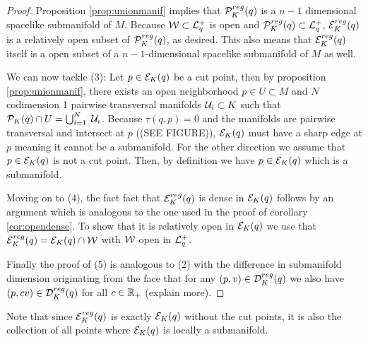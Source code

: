 \begin{proof}
Proposition \ref{prop:unionmanif} implies that ${\mathcal{P}}^{reg}_K(q)$ is a $n-1$ dimensional spacelike submanifold of $M$. Because ${\mathcal{W}}\subset {\mathcal{L}}^+_q$ is open and ${\mathcal{P}}^{reg}_K(q)\subset {\mathcal{L}}^+_q$, ${\mathcal{E}}^{reg}_K(q)$ is a relatively open subset of ${\mathcal{P}}^{reg}_K(q)$, as desired. This also means that  ${\mathcal{E}}^{reg}_K(q)$ itself is a open subset of a $n-1$-dimensional spacelike submanifold of $M$ as well.

We can now tackle (3): 
Let $p\in {\mathcal{E}}_K(q)$ be a cut point, then by proposition \ref{prop:unionmanif}, there exists an open neighborhood $p\in U \subset M$ and $N$ codimension 1 pairwise transversal manifolds $\mathcal{U}_i\subset K$ such that ${\mathcal{P}}_K(q)\cap U = \bigcup_{i=1}^N \; \mathcal{U}_i$. Because $\tau(q,p)=0$ and the manifolds are pairwise transversal and intersect at $p$ ((SEE FIGURE)), ${\mathcal{E}}_K(q)$ must have a sharp edge at $p$ meaning it cannot be a submanifold. For the other direction we assume that $p\in {\mathcal{E}}_K(q)$ is not a cut point. Then, by definition we have $p\in {\mathcal{E}}_K(q)$ which is a submanifold.

Moving on to (4), the fact fact that ${\mathcal{E}}^{reg}_K(q)$ is dense in  ${\mathcal{E}}_K(q)$ follows by an argument which is analogous to the one used in the proof of corollary \ref{cor:opendense}. To show that it is relatively open in ${\mathcal{E}}_K(q)$ we use that ${\mathcal{E}}^{reg}_K(q) = {\mathcal{E}}_K(q) \cap {\mathcal{W}}$ with ${\mathcal{W}}$ open in ${\mathcal{L}}^+_q$.

Finally the proof of (5) is analogous to (2) with the difference in submanifold dimension originating from the face that for any $(p,v)\in {\mathcal{D}}^{reg}_K(q)$ we also have $(p,cv)\in {\mathcal{D}}^{reg}_K(q)$ for all $c\in \mathbb{R}_+$ (explain more).
\end{proof}

Note that since ${\mathcal{E}}^{reg}_K(q)$ is exactly ${\mathcal{E}}_K(q)$ without the cut points, it is also the collection of all points where ${\mathcal{E}}_K(q)$ is locally a submanifold.

